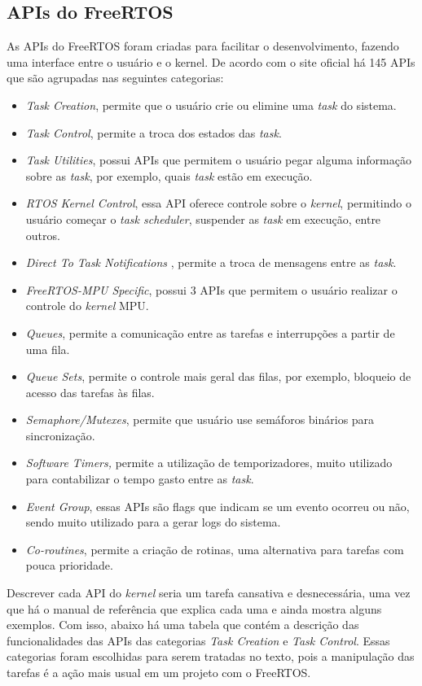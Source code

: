 \subsection{APIs do FreeRTOS}

As APIs do FreeRTOS foram criadas para facilitar o desenvolvimento, fazendo uma interface entre o usuário e o kernel. De acordo com o site oficial há 145 APIs que são agrupadas nas seguintes categorias:

\begin{itemize}
	\item\textit{Task Creation}, permite que o usuário crie ou elimine uma \textit{task} do sistema.
	\item\textit{Task Control}, permite a troca dos estados das \textit{task}.
	\item\textit{Task Utilities}, possui APIs que permitem o usuário pegar alguma informação sobre as \textit{task}, por exemplo, quais \textit{task} estão em execução.
	\item\textit{RTOS Kernel Control}, essa API oferece controle sobre o \textit{kernel}, permitindo o usuário começar o \textit{task scheduler},  suspender as \textit{task} em execução, entre outros.
	\item\textit{Direct To Task Notifications} , permite a troca de mensagens entre as \textit{task}.
	\item\textit{FreeRTOS-MPU Specific}, possui 3 APIs que permitem o usuário realizar o controle do \textit{kernel} MPU.
	\item\textit{Queues}, permite a comunicação entre as tarefas e interrupções a partir de uma fila.
	\item\textit{Queue Sets}, permite o controle mais geral das filas, por exemplo, bloqueio de acesso das tarefas às filas.
	\item\textit{Semaphore/Mutexes}, permite que usuário use semáforos binários para sincronização.
	\item\textit{Software Timers,} permite a utilização de temporizadores, muito utilizado para contabilizar o tempo gasto entre as \textit{task}.
	\item\textit{Event Group}, essas APIs são flags que indicam se um evento ocorreu ou não, sendo muito utilizado para a gerar logs do sistema.
	\item\textit{Co-routines}, permite a criação de rotinas, uma alternativa para tarefas com pouca prioridade.
\end{itemize}

Descrever cada API do \textit{kernel} seria um tarefa cansativa e desnecessária, uma vez que há o manual de referência que explica cada uma e ainda mostra alguns exemplos. Com isso, abaixo há uma tabela que contém a descrição das funcionalidades das APIs das categorias \textit{Task Creation} e \textit{Task Control}. Essas categorias foram escolhidas para serem tratadas no texto, pois a manipulação das tarefas é a ação mais usual em um projeto com o FreeRTOS.


